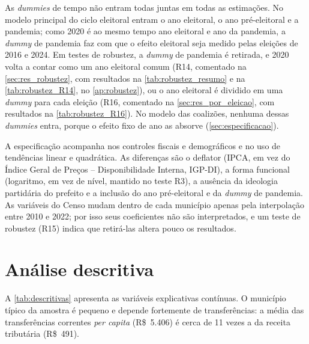 As \textit{dummies} de tempo não entram todas juntas em todas as estimações. No modelo principal do ciclo eleitoral entram o ano eleitoral, o ano pré-eleitoral e a pandemia; como 2020 é ao mesmo tempo ano eleitoral e ano da pandemia, a \textit{dummy} de pandemia faz com que o efeito eleitoral seja medido pelas eleições de 2016 e 2024. Em testes de robustez, a \textit{dummy} de pandemia é retirada, e 2020 volta a contar como um ano eleitoral comum (R14, comentado na \autoref{sec:res_robustez}, com resultados na \autoref{tab:robustez_resumo} e na \autoref{tab:robustez_R14}, no \autoref{ap:robustez}), ou o ano eleitoral é dividido em uma \textit{dummy} para cada eleição (R16, comentado na \autoref{sec:res_por_eleicao}, com resultados na \autoref{tab:robustez_R16}). No modelo das coalizões, nenhuma dessas \textit{dummies} entra, porque o efeito fixo de ano as absorve (\autoref{sec:especificacao}).

A especificação acompanha \textcite{sakurai2009} nos controles fiscais e demográficos e no uso de tendências linear e quadrática. As diferenças são o deflator (IPCA, em vez do Índice Geral de Preços -- Disponibilidade Interna, IGP-DI), a forma funcional (logaritmo, em vez de nível, mantido no teste R3), a ausência da ideologia partidária do prefeito e a inclusão do ano pré-eleitoral e da \textit{dummy} de pandemia. As variáveis do Censo mudam dentro de cada município apenas pela interpolação entre 2010 e 2022; por isso seus coeficientes não são interpretados, e um teste de robustez (R15) indica que retirá-las altera pouco os resultados.

\section{Análise descritiva}\label{sec:descritivas}

A \autoref{tab:descritivas} apresenta as variáveis explicativas contínuas. O município típico da amostra é pequeno e depende fortemente de transferências: a média das transferências correntes \textit{per capita} (R\$~5.406) é cerca de 11 vezes a da receita tributária (R\$~491).

